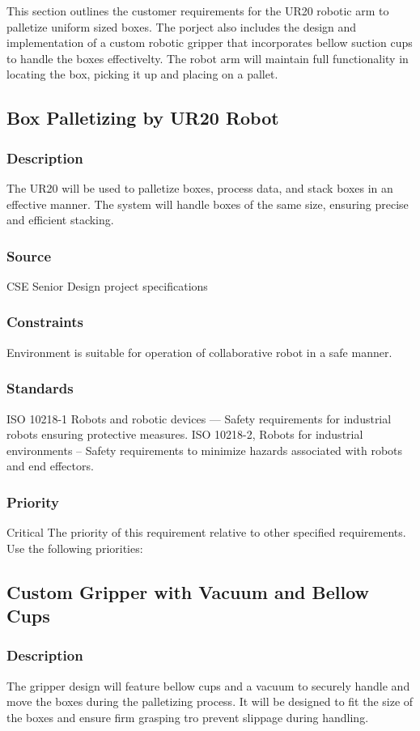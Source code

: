 This section outlines the customer requirements for the UR20 robotic arm to palletize uniform sized boxes. The porject also includes the design and implementation of a custom robotic gripper that incorporates bellow suction cups to handle the boxes effectivelty. The robot arm will maintain full functionality in locating the box, picking it up and placing on a pallet. 
\subsection{Box Palletizing by UR20 Robot}
\subsubsection{Description}
The UR20 will be used to palletize boxes, process data, and stack boxes in an effective manner. The system will handle boxes of the same size, ensuring precise and efficient stacking.
\subsubsection{Source}
 CSE Senior Design project specifications
\subsubsection{Constraints}
Environment is suitable for operation of collaborative robot in a safe manner. 
\subsubsection{Standards}
ISO 10218-1 Robots and robotic devices — Safety requirements for industrial robots ensuring protective measures.
ISO 10218-2, Robots for industrial environments – Safety requirements to minimize hazards associated with robots and end effectors.
\subsubsection{Priority}
Critical
The priority of this requirement relative to other specified requirements. Use the following priorities:

\subsection{Custom Gripper with Vacuum and Bellow Cups}
\subsubsection{Description}
The gripper design will feature bellow cups and a vacuum to securely handle and move the boxes during the palletizing process. It will be designed to fit the size of the boxes and ensure firm grasping tro prevent slippage during handling.
